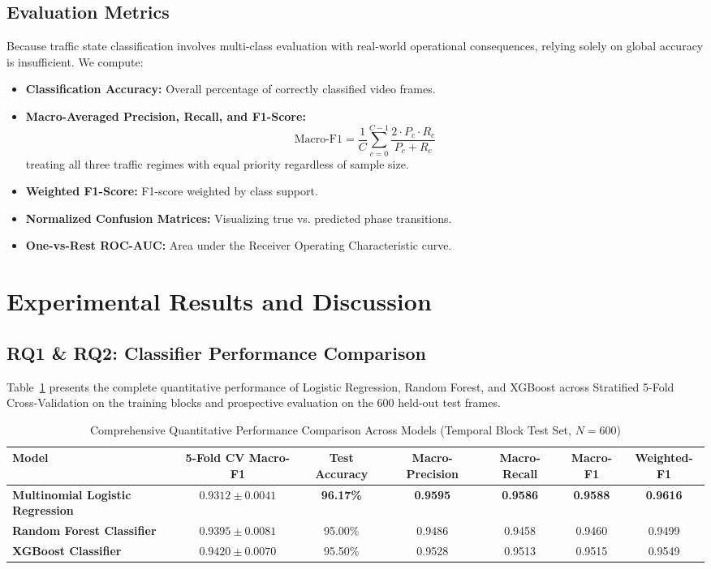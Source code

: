 \documentclass[conference]{IEEEtran}
\begin{document}
\subsection{Evaluation Metrics}
Because traffic state classification involves multi-class evaluation with real-world operational consequences, relying solely on global accuracy is insufficient. We compute:
\begin{itemize}
    \item \textbf{Classification Accuracy:} Overall percentage of correctly classified video frames.
    \item \textbf{Macro-Averaged Precision, Recall, and F1-Score:}
    \begin{equation}
        \text{Macro-F1} = \frac{1}{C}\sum_{c=0}^{C-1} \frac{2 \cdot P_c \cdot R_c}{P_c + R_c}
    \end{equation}
    treating all three traffic regimes with equal priority regardless of sample size.
    \item \textbf{Weighted F1-Score:} F1-score weighted by class support.
    \item \textbf{Normalized Confusion Matrices:} Visualizing true vs. predicted phase transitions.
    \item \textbf{One-vs-Rest ROC-AUC:} Area under the Receiver Operating Characteristic curve.
\end{itemize}

\section{Experimental Results and Discussion}

\subsection{RQ1 \& RQ2: Classifier Performance Comparison}
Table~\ref{tab:main_metrics} presents the complete quantitative performance of Logistic Regression, Random Forest, and XGBoost across Stratified 5-Fold Cross-Validation on the training blocks and prospective evaluation on the 600 held-out test frames.

\begin{table}[t]
\caption{Comprehensive Quantitative Performance Comparison Across Models (Temporal Block Test Set, $N=600$)}
\label{tab:main_metrics}
\centering
\begin{tabular}{lcccccc}
\toprule
\textbf{Model} & \textbf{5-Fold CV Macro-F1} & \textbf{Test Accuracy} & \textbf{Macro-Precision} & \textbf{Macro-Recall} & \textbf{Macro-F1} & \textbf{Weighted-F1} \\
\midrule
\textbf{Multinomial Logistic Regression} & $0.9312 \pm 0.0041$ & \textbf{96.17\%} & \textbf{0.9595} & \textbf{0.9586} & \textbf{0.9588} & \textbf{0.9616} \\
\textbf{Random Forest Classifier}        & $0.9395 \pm 0.0081$ & 95.00\% & 0.9486 & 0.9458 & 0.9460 & 0.9499 \\
\textbf{XGBoost Classifier}              & $\mathbf{0.9420 \pm 0.0070}$ & 95.50\% & 0.9528 & 0.9513 & 0.9515 & 0.9549 \\
\bottomrule
\end{tabular}
\end{table}
\end{document}
